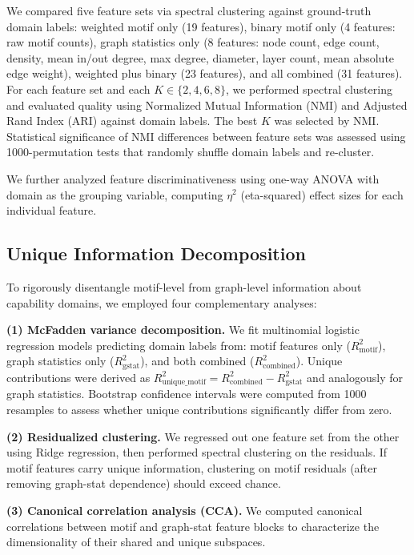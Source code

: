 We compared five feature sets via spectral clustering \cite{ng2002spectral} against ground-truth domain labels: weighted motif only (19 features), binary motif only (4 features: raw motif counts), graph statistics only (8 features: node count, edge count, density, mean in/out degree, max degree, diameter, layer count, mean absolute edge weight), weighted plus binary (23 features), and all combined (31 features). For each feature set and each $K \in \{2, 4, 6, 8\}$, we performed spectral clustering and evaluated quality using Normalized Mutual Information (NMI) and Adjusted Rand Index (ARI) against domain labels. The best $K$ was selected by NMI. Statistical significance of NMI differences between feature sets was assessed using 1000-permutation tests that randomly shuffle domain labels and re-cluster.

We further analyzed feature discriminativeness using one-way ANOVA with domain as the grouping variable, computing $\eta^2$ (eta-squared) effect sizes for each individual feature.

\subsection{Unique Information Decomposition}\label{sec:uid}
To rigorously disentangle motif-level from graph-level information about capability domains, we employed four complementary analyses:

\textbf{(1) McFadden variance decomposition.} We fit multinomial logistic regression models predicting domain labels from: motif features only ($R^2_{\text{motif}}$), graph statistics only ($R^2_{\text{gstat}}$), and both combined ($R^2_{\text{combined}}$). Unique contributions were derived as $R^2_{\text{unique\_motif}} = R^2_{\text{combined}} - R^2_{\text{gstat}}$ and analogously for graph statistics. Bootstrap confidence intervals were computed from 1000 resamples to assess whether unique contributions significantly differ from zero.

\textbf{(2) Residualized clustering.} We regressed out one feature set from the other using Ridge regression, then performed spectral clustering on the residuals. If motif features carry unique information, clustering on motif residuals (after removing graph-stat dependence) should exceed chance.

\textbf{(3) Canonical correlation analysis (CCA).} We computed canonical correlations between motif and graph-stat feature blocks to characterize the dimensionality of their shared and unique subspaces.


